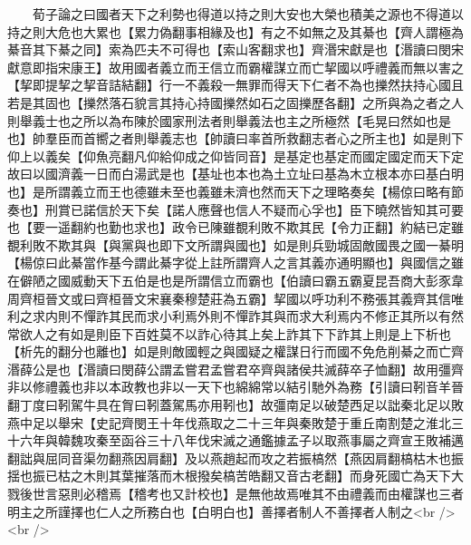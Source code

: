 　　荀子論之曰國者天下之利勢也得道以持之則大安也大榮也積美之源也不得道以持之則大危也大累也【累力偽翻事相緣及也】有之不如無之及其綦也【齊人謂極為綦音其下綦之同】索為匹夫不可得也【索山客翻求也】齊湣宋獻是也【湣讀曰閔宋獻意即指宋康王】故用國者義立而王信立而霸權謀立而亡挈國以呼禮義而無以害之【挈即提挈之挈音詰結翻】行一不義殺一無罪而得天下仁者不為也擽然扶持心國且若是其固也【擽然落石貌言其持心持國擽然如石之固擽歷各翻】之所與為之者之人則舉義士也之所以為布陳於國家刑法者則舉義法也主之所極然【毛晃曰然如也是也】帥羣臣而首嚮之者則舉義志也【帥讀曰率首所救翻志者心之所主也】如是則下仰上以義矣【仰魚亮翻凡仰給仰成之仰皆同音】是基定也基定而國定國定而天下定故曰以國濟義一日而白湯武是也【基址也本也為土立址曰基為木立根本亦曰基白明也】是所謂義立而王也德雖未至也義雖未濟也然而天下之理略奏矣【楊倞曰略有節奏也】刑賞已諾信於天下矣【諾人應聲也信人不疑而心孚也】臣下曉然皆知其可要也【要一遥翻約也勤也求也】政令已陳雖覩利敗不欺其民【令力正翻】約結已定雖覩利敗不欺其與【與黨與也即下文所謂與國也】如是則兵勁城固敵國畏之國一綦明【楊倞曰此綦當作基今謂此綦字從上註所謂齊人之言其義亦通明顯也】與國信之雖在僻陋之國威動天下五伯是也是所謂信立而霸也【伯讀曰霸五霸夏昆吾商大彭豕韋周齊桓晉文或曰齊桓晉文宋襄秦穆楚莊為五霸】挈國以呼功利不務張其義齊其信唯利之求内則不憚詐其民而求小利焉外則不憚詐其與而求大利焉内不修正其所以有然常欲人之有如是則臣下百姓莫不以詐心待其上矣上詐其下下詐其上則是上下析也【析先的翻分也離也】如是則敵國輕之與國疑之權謀日行而國不免危削綦之而亡齊湣薛公是也【湣讀曰閔薛公謂孟嘗君孟嘗君卒齊與諸侯共滅薛卒子恤翻】故用彊齊非以修禮義也非以本政教也非以一天下也綿綿常以結引馳外為務【引讀曰靷音羊晉翻丁度曰靷駕牛具在胷曰靷蓋駕馬亦用靷也】故彊南足以破楚西足以詘秦北足以敗燕中足以舉宋【史記齊閔王十年伐燕取之二十三年與秦敗楚于重丘南割楚之淮北三十六年與韓魏攻秦至函谷三十八年伐宋滅之通鑑據孟子以取燕事屬之齊宣王敗補邁翻詘與屈同音渠勿翻燕因肩翻】及以燕趙起而攻之若振槁然【燕因肩翻槁枯木也振揺也振已枯之木則其葉摧落而木根撥矣槁苦皓翻又音古老翻】而身死國亡為天下大戮後世言惡則必稽焉【稽考也又計校也】是無他故焉唯其不由禮義而由權謀也三者明主之所謹擇也仁人之所務白也【白明白也】善擇者制人不善擇者人制之<br />
<br />
